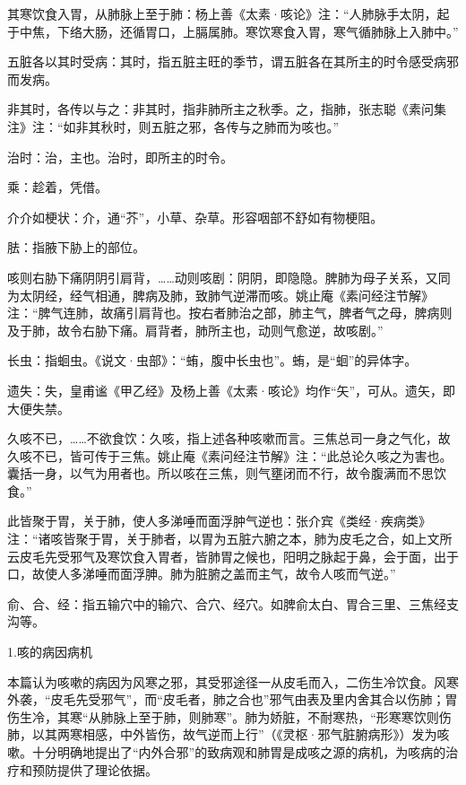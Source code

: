 \documentclass[draft,12pt]{ctexbook}
\begin{document}
\begin{jiaozhu}
	\item 其寒饮食入胃，从肺脉上至于肺：杨上善《太素·咳论》注：“人肺脉手太阴，起于中焦，下络大肠，还循胃口，上膈属肺。寒饮寒食入胃，寒气循肺脉上入肺中。”
	\item 五脏各以其时受病：其时，指五脏主旺的季节，谓五脏各在其所主的时令感受病邪而发病。
	\item 非其时，各传以与之：非其时，指非肺所主之秋季。之，指肺，张志聪《素问集注》注：“如非其秋时，则五脏之邪，各传与之肺而为咳也。”
	\item 治时：治，主也。治时，即所主的时令。
	\item 乘：趁着，凭借。
	\item 介介如梗状：介，通“芥”，小草、杂草。形容咽部不舒如有物梗阻。
	\item 胠：指腋下胁上的部位。
	\item 咳则右胁下痛阴阴引肩背，……动则咳剧：阴阴，即隐隐。脾肺为母子关系，又同为太阴经，经气相通，脾病及肺，致肺气逆滞而咳。姚止庵《素问经注节解》注：“脾气连肺，故痛引肩背也。按右者肺治之部，肺主气，脾者气之母，脾病则及于肺，故令右胁下痛。肩背者，肺所主也，动则气愈逆，故咳剧。”
	\item 长虫：指蛔虫。《说文·虫部》：“蛕，腹中长虫也”。蛕，是“蛔”的异体字。
	\item 遗失：失，皇甫谧《甲乙经》及杨上善《太素·咳论》均作“矢”，可从。遗矢，即大便失禁。
	\item 久咳不已，……不欲食饮：久咳，指上述各种咳嗽而言。三焦总司一身之气化，故久咳不已，皆可传于三焦。姚止庵《素问经注节解》注：“此总论久咳之为害也。囊括一身，以气为用者也。所以咳在三焦，则气壅闭而不行，故令腹满而不思饮食。”
	\item 此皆聚于胃，关于肺，使人多涕唾而面浮肿气逆也：张介宾《类经·疾病类》注：“诸咳皆聚于胃，关于肺者，以胃为五脏六腑之本，肺为皮毛之合，如上文所云皮毛先受邪气及寒饮食入胃者，皆肺胃之候也，阳明之脉起于鼻，会于面，出于口，故使人多涕唾而面浮胂。肺为脏腑之盖而主气，故令人咳而气逆。”
	\item 俞、合、经：指五输穴中的输穴、合穴、经穴。如脾俞太白、胃合三里、三焦经支沟等。
\end{jiaozhu}


1.咳的病因病机

本篇认为咳嗽的病因为风寒之邪，其受邪途径一从皮毛而入，二伤生冷饮食。风寒外袭，“皮毛先受邪气”，而“皮毛者，肺之合也”邪气由表及里内舍其合以伤肺；胃伤生冷，其寒“从肺脉上至于肺，则肺寒”。肺为娇脏，不耐寒热，“形寒寒饮则伤肺，以其两寒相感，中外皆伤，故气逆而上行”（《灵枢·邪气脏腑病形》）发为咳嗽。十分明确地提出了“内外合邪”的致病观和肺胃是成咳之源的病机，为咳病的治疗和预防提供了理论依据。
\end{document}
